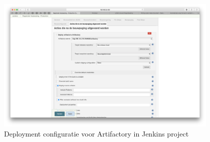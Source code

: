 \begin{figure}[H]
	\centering
	\includegraphics[width=0.95\textwidth]{img/ArtifactoryDeploy.png}
	\caption{Deployment configuratie voor Artifactory in Jenkins project}
	\label{fig:ArtifactoryDeploy}
\end{figure}